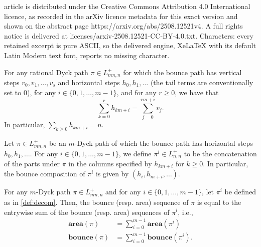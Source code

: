 \documentclass[10pt,a4paper]{amsart}
\newcommand{\aarea}{\mathbf{area}}
\newcommand{\bbounce}{\mathbf{bounce}}
\begin{document}
article is distributed under the Creative Commons Attribution 4.0 International licence, as recorded in the arXiv licence metadata for this exact version and shown on the abstract page https://arxiv.org/abs/2508.12521v4. A full rights notice is delivered at licenses/arxiv-2508.12521-CC-BY-4.0.txt. Characters: every retained excerpt is pure ASCII, so the delivered engine, XeLaTeX with its default Latin Modern text font, reports no missing character.
\begin{lem}\label{lem:hv}
For any rational Dyck path $\pi \in L_{mn,n}^+$ for which the bounce path has vertical steps $v_0,v_1,\dots,v_{s}$ and horizontal steps $h_0,h_1,\dots$ (the tail terms are conventionally set to 0), for any $i \in \{0,1,\dots,m-1\}$, and for any $r \geq 0$, we have that
\begin{equation}
\sum_{k = 0}^{r} h_{km+i} = \sum_{j=0}^{rm+i} v_j.
\end{equation}
In particular, $\sum_{k \geq 0} h_{km+i} = n$.
\end{lem}

\begin{definition}\label{def:decom}
Let $\pi \in L_{mn,n}^+$ be an $m$-Dyck path of which the bounce path has horizontal steps $h_0,h_1,\dots$.
For any $i \in \{0,1,\dots,m-1\}$, we define $\pi^i \in L_{n,n}^+$ to be the concatenation of the parts under $\pi$ in the columns specified by $h_{km+i}$ for $k\geq 0$.
In particular, the bounce composition of $\pi^i$ is given by $(h_i,h_{m+i},\dots)$.
\end{definition}

\begin{thm}\label{thm:decomp}
For any $m$-Dyck path $\pi \in L_{mn,n}^+$ and for any $i \in \{0,1,\dots,m-1\}$, let $\pi^i$ be defined as in \cref{def:decom}.
Then, the bounce (resp. area) sequence of $\pi$ is equal to the entrywise sum of the bounce (resp. area) sequences of $\pi^i$, i.e.,
\begin{align}
\aarea(\pi) &= \sum_{i=0}^{m-1} \aarea(\pi^i) \\
\bbounce(\pi) &= \sum_{i=0}^{m-1} \bbounce(\pi^i).
\end{align}
\end{thm}
\end{document}
